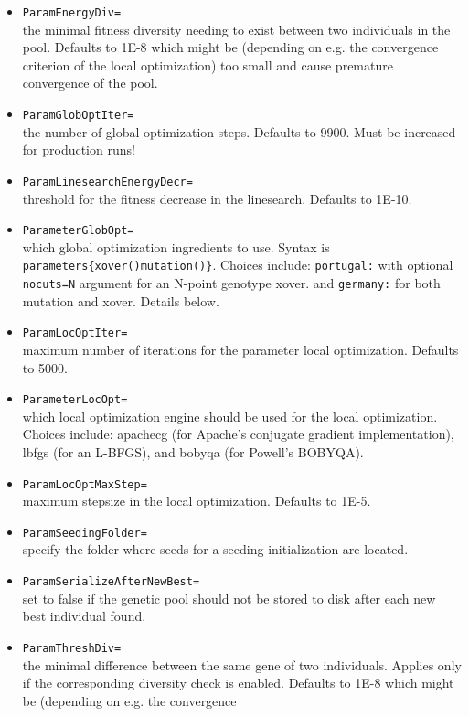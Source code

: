 \documentclass[a4paper,10pt]{scrbook}
\begin{document}
\begin{itemize}
  \item \texttt{ParamEnergyDiv=}\\
	the minimal fitness diversity needing to exist between two individuals
in the pool. Defaults to 1E-8 which might be (depending on e.g. the convergence
criterion of the local optimization) too small and cause premature convergence
of the pool.
  \item \texttt{ParamGlobOptIter=}\\
	the number of global optimization steps. Defaults to 9900. Must be
	increased for production runs!
  \item \texttt{ParamLinesearchEnergyDecr=}\\
	threshold for the fitness decrease in the linesearch. Defaults to 1E-10.
  \item \texttt{ParameterGlobOpt=}\\
	which global optimization ingredients to use. Syntax is
	\texttt{parameters\{xover()mutation()\}}. Choices include: \texttt{portugal:}
	with optional \texttt{nocuts=N} argument for an N-point genotype xover.
	and \texttt{germany:} for both mutation and xover. Details below.
  \item \texttt{ParamLocOptIter=}\\
	maximum number of iterations for the parameter local optimization.
Defaults to 5000.
  \item \texttt{ParameterLocOpt=}\\
	which local optimization engine should be used for the local optimization.
	Choices include: apachecg (for Apache's conjugate gradient implementation),
	lbfgs (for an L-BFGS), and bobyqa (for Powell's BOBYQA).
  \item \texttt{ParamLocOptMaxStep=}\\
	maximum stepsize in the local optimization. Defaults to 1E-5.
  \item \texttt{ParamSeedingFolder=}\\
	specify the folder where seeds for a seeding initialization are located.
  \item \texttt{ParamSerializeAfterNewBest=}\\
	set to false if the genetic pool should not be stored to disk after each
	new best individual found.
  \item \texttt{ParamThreshDiv=}\\
	the minimal difference between the same gene of two individuals. Applies
only if the corresponding diversity check is enabled. Defaults to 1E-8 which
might be (depending on e.g. the convergence

\end{itemize}
\end{document}

